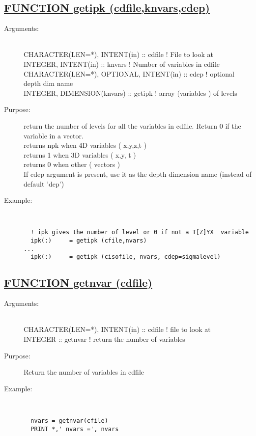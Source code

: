 \documentclass[a4paper,11pt]{article}
\begin{document}
\subsection*{\underline{FUNCTION getipk (cdfile,knvars,cdep)  }}
\begin{description}
\item[Arguments:] \ \\
    CHARACTER(LEN=*), INTENT(in) :: cdfile   ! File to look at\\
    INTEGER, INTENT(in)  ::  knvars          ! Number of variables in cdfile\\
    CHARACTER(LEN=*), OPTIONAL, INTENT(in) :: cdep ! optional depth dim name\\
    INTEGER, DIMENSION(knvars) :: getipk     ! array (variables ) of levels
\item[Purpose:]return the number of levels for all the variables in cdfile. Return 0 if the variable in a vector. \\
                    returns npk when 4D variables ( x,y,z,t ) \\
                    returns  1  when 3D variables ( x,y,  t ) \\
                    returns  0  when other ( vectors ) \\
   If cdep argument is present, use it as the depth dimension name (instead of default 'dep')
\item[Example:]\ \\
\begin{verbatim}
  ! ipk gives the number of level or 0 if not a T[Z]YX  variable
  ipk(:)     = getipk (cfile,nvars)
...
  ipk(:)     = getipk (cisofile, nvars, cdep=sigmalevel)
\end{verbatim}
\end{description}
\newpage

\subsection*{\underline{FUNCTION getnvar (cdfile)  }}
\begin{description}
\item[Arguments:] \ \\
    CHARACTER(LEN=*), INTENT(in) ::  cdfile   ! file to look at \\
    INTEGER :: getnvar                        ! return the number of variables \\
\item[Purpose:] Return the number of variables in cdfile
\item[Example:]\ \\
\begin{verbatim}
  nvars = getnvar(cfile)
  PRINT *,' nvars =', nvars
\end{verbatim}
\end{description}
\end{document}
